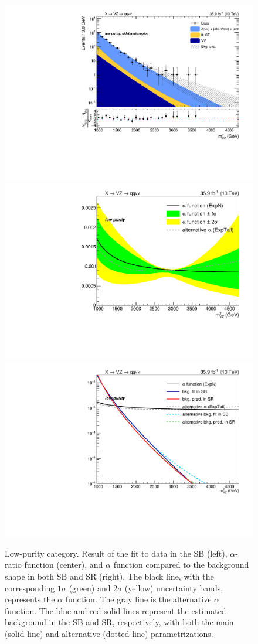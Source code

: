 \begin{figure}[!htb]
  \centering
    \includegraphics[width=.33\textwidth]{plotsAlpha_tesi/XVZnnlp/BkgSB.pdf}
    \includegraphics[width=.33\textwidth]{plotsAlpha_tesi/XVZnnlp/AlphaRatio.pdf}
    \includegraphics[width=.33\textwidth]{plotsAlpha_tesi/XVZnnlp/AlphaMethod_log.pdf}
  \caption{Low-purity category. Result of the fit to data in the SB (left), $\alpha$-ratio function (center), and $\alpha$ function compared to the background shape in both SB and SR (right). The black line, with the corresponding $1\sigma$ (green) and $2\sigma$ (yellow) uncertainty bands, represents the $\alpha$ function. The gray line is the alternative $\alpha$ function. The blue and red solid lines represent the estimated background in the SB and SR, respectively, with both the main (solid line) and alternative (dotted line) parametrizations.}
  \label{fig:XVZnnlp_Alpha}
\end{figure}



